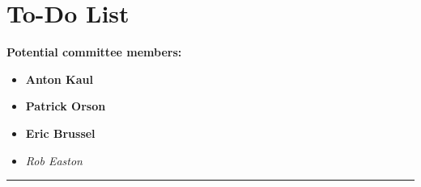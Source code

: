 \chapter{To-Do List}\label{ch:todo}

\textbf{Potential committee members:}
\begin{itemize}
    \item \textbf{Anton Kaul}
    \item \textbf{Patrick Orson}
    \item \textbf{Eric Brussel}
    \item \textit{Rob Easton}
    
\end{itemize}

\begin{center}\rule{.85\textwidth}{0.65pt}\end{center}

